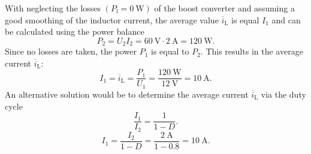 \begin{solutionblock}
    With neglecting the losses $(P_{\mathrm{l}} = \SI{0}{\watt})$ of the boost converter and assuming a good smoothing of the inductor current, the average value $\overline i_{\mathrm{L}}$ is equal $I_{\mathrm{1}}$ and can be calculated using the power balance
    \begin{equation}
        P_{\mathrm{2}} = U_{\mathrm{2}} I_{\mathrm{2}} = {\SI{60}{\volt}} \cdot {\SI{2}{\ampere}} = {\SI{120}{\watt}}.
    \end{equation}
    Since no losses are taken, the power  $P_{\mathrm{1}}$ is equal to  $P_{\mathrm{2}}$.
    This results in the average current $\overline i_{\mathrm{L}}$:
    \begin{equation}
         I_{\mathrm{1}} = \overline i_{\mathrm{L}} = \frac{P_{\mathrm{1}}}{U_{\mathrm{1}}}= \frac{\SI{120}{\watt}}{\SI{12}{\volt}} = \SI{10}{\ampere}.
    \end{equation}
    An alternative solution would be to determine the average current $\overline i_{\mathrm{L}}$ via the duty cycle
    \begin{equation}
    \frac{I_{\mathrm{1}}}{I_{\mathrm{2}}}=\frac{1}{1-D}.
    \end{equation}
    \begin{equation}
     I_{\mathrm{1}}=\frac{I_{\mathrm{2}}}{1-D}=\frac{\SI{2}{\ampere}}{1-0.8}= \SI{10}{\ampere}.
    \end{equation}
\end{solutionblock}

